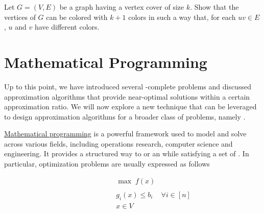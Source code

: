 \documentclass[a4paper, 12pt]{report}
\begin{document}
    \begin{framedprob}{}
        Let $G = (V, E)$ be a graph having a vertex cover of size $k$. Show that the vertices of $G$ can be colored with $k + 1$ colors in such a way that, for each $uv \in E$, $u$ and $v$ have different colors.
    \end{framedprob}


    \chapter{Mathematical Programming}

    Up to this point, we have introduced several \NPclass-complete problems and discussed approximation algorithms that provide near-optimal solutions within a certain approximation ratio. We will now explore a new technique that can be leveraged to design approximation algorithms for a broader class of problems, namely .

    \href{https://en.wikipedia.org/wiki/Mathematical_optimization}{Mathematical programming} is a powerful framework used to model and solve  across various fields, including operations research, computer science and engineering. It provides a structured way to  or  an  while satisfying a set of . In particular, optimization problems are usually expressed as follows

    \begin{figure}[H]
        \centering
        \[\begin{array}{ccl}
            \qquad\qquad\quad
            & \max \; f(x) \\\\
            & g_i(x) \le b_i & \forall i \in [n] \\
            & x \in V
        \end{array}\]
    \end{figure}
\end{document}
